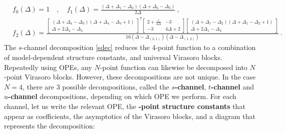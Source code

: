 \documentclass[12pt, a4paper]{article}
\newcommand{\myindex}[1]{\textbf{\boldmath #1}}
\begin{document}
\begin{subequations}
\begin{align}
& f_0(\Delta) = 1 \quad , \quad f_1(\Delta) = \frac{(\Delta+\Delta_1-\Delta_2)(\Delta+\Delta_4-\Delta_3)}{2\Delta} \ ,
\\
& f_2(\Delta) =  \frac{\left[\begin{smallmatrix} (\Delta+\Delta_4-\Delta_3)(\Delta+\Delta_4-\Delta_3+1) \\ \Delta+2\Delta_4-\Delta_3 \end{smallmatrix}\right]^T
\left[\begin{smallmatrix} 2+\frac{c}{4\Delta} & -3 \\ -3 & 4\Delta+2 \end{smallmatrix}\right]
\left[\begin{smallmatrix} (\Delta+\Delta_1-\Delta_2)(\Delta+\Delta_1-\Delta_2+1) \\ \Delta+2\Delta_1-\Delta_2 \end{smallmatrix}\right]}{16(\Delta-\Delta_{(2,1)})(\Delta-\Delta_{(1,2)})}
 \ .
 \label{f2d}
\end{align}
\end{subequations}
The $s$-channel decomposition \eqref{sdec} reduces the 4-point function to a combination of model-dependent structure constants, and universal Virasoro blocks. Repeatedly using OPEs, any $N$-point function can likewise be decomposed into $N$-point Virasoro blocks. However, these decompositions are not unique. In the case $N=4$, there are 3 possible decompositions, called the \myindex{$s$-channel}, \myindex{$t$-channel} and \myindex{$u$-channel} decompositions, depending on which OPE we perform. For each channel, let us write the relevant OPE, the \myindex{4-point structure constants} that appear as coefficients, the asymptotics of the Virasoro blocks, and a diagram that represents the decomposition:
\end{document}
